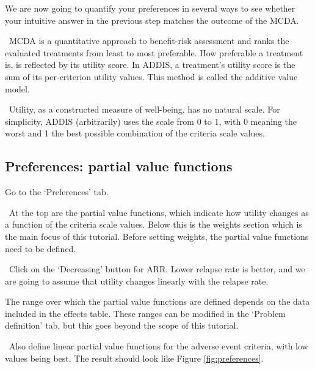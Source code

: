 \documentclass[00_mcda_tutorial.tex]{subfiles}
\begin{document}
\noindent We are now going to quantify your preferences in several ways to see whether your intuitive answer in the previous step matches the outcome of the MCDA.
\newline

\noindent \faGraduationCap \, MCDA is a quantitative approach to benefit-risk assessment and ranks the evaluated treatments from least to most preferable. How preferable a treatment is, is reflected by its utility score. In ADDIS, a treatment’s utility score is the sum of its per-criterion utility values. This method is called the additive value model.
\newline

\noindent \faGraduationCap \, Utility, as a constructed measure of well-being, has no natural scale. For simplicity, ADDIS (arbitrarily) uses the scale from 0 to 1, with 0 meaning the worst and 1 the best possible combination of the criteria scale values.

\subsection*{Preferences: partial value functions}
\leftpointright Go to the ‘Preferences’ tab.
\newline

\noindent \faGraduationCap \, At the top are the partial value functions, which indicate how utility changes as a function of the criteria scale values. Below this is the weights section which is the main focus of this tutorial. Before setting weights, the partial value functions need to be defined.
\newline

\noindent \leftpointright \, Click on the ‘Decreasing’ button for ARR. Lower relapse rate is better, and we are going to assume that utility changes linearly with the relapse rate.

\noindent The range over which the partial value functions are defined depends on the data included in the effects table. These ranges can be modified in the ‘Problem definition’ tab, but this goes beyond the scope of this tutorial.
\newline

\noindent \leftpointright \, Also define linear partial value functions for the adverse event criteria, with low values being best. The result should look like Figure \ref{fig:preferences}.
\newline
\end{document}
